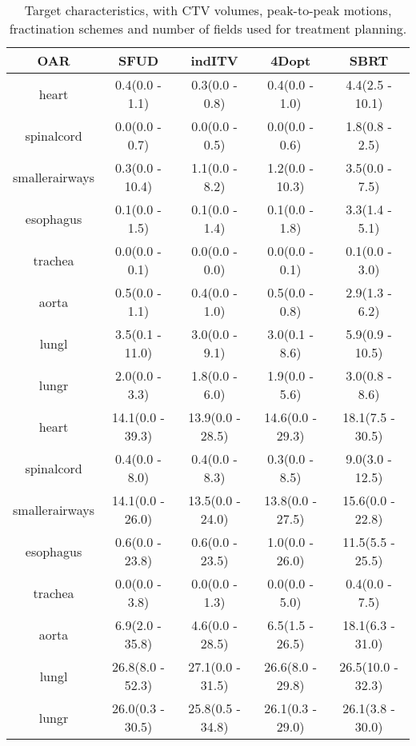 \begin{table}[H]
	\centering
	\caption{Target characteristics, with CTV volumes, peak-to-peak motions, fractination schemes and number of fields used for treatment planning.}
	\begin{tabular}{c|c|c|c|c}
		\hline\hline
		OAR & SFUD & indITV & 4Dopt & SBRT \\
		\hline
heart & 0.4(0.0 - 1.1) & 0.3(0.0 - 0.8) & 0.4(0.0 - 1.0) & 4.4(2.5 - 10.1)  \\ 
spinalcord & 0.0(0.0 - 0.7) & 0.0(0.0 - 0.5) & 0.0(0.0 - 0.6) & 1.8(0.8 - 2.5)  \\ 
smallerairways & 0.3(0.0 - 10.4) & 1.1(0.0 - 8.2) & 1.2(0.0 - 10.3) & 3.5(0.0 - 7.5) \\ 
esophagus & 0.1(0.0 - 1.5) & 0.1(0.0 - 1.4) & 0.1(0.0 - 1.8) & 3.3(1.4 - 5.1)  \\ 
trachea & 0.0(0.0 - 0.1) & 0.0(0.0 - 0.0) & 0.0(0.0 - 0.1) & 0.1(0.0 - 3.0)  \\ 
aorta & 0.5(0.0 - 1.1) & 0.4(0.0 - 1.0) & 0.5(0.0 - 0.8) & 2.9(1.3 - 6.2)  \\ 
lungl & 3.5(0.1 - 11.0) & 3.0(0.0 - 9.1) & 3.0(0.1 - 8.6) & 5.9(0.9 - 10.5)  \\ 
lungr & 2.0(0.0 - 3.3) & 1.8(0.0 - 6.0) & 1.9(0.0 - 5.6) & 3.0(0.8 - 8.6)  \\ 

\hline\hline

heart & 14.1(0.0 - 39.3) & 13.9(0.0 - 28.5) & 14.6(0.0 - 29.3) & 18.1(7.5 - 30.5)\\ 
spinalcord & 0.4(0.0 - 8.0) & 0.4(0.0 - 8.3) & 0.3(0.0 - 8.5) & 9.0(3.0 - 12.5)\\ 
smallerairways & 14.1(0.0 - 26.0) & 13.5(0.0 - 24.0) & 13.8(0.0 - 27.5) & 15.6(0.0 - 22.8)\\ 
esophagus & 0.6(0.0 - 23.8) & 0.6(0.0 - 23.5) & 1.0(0.0 - 26.0) & 11.5(5.5 - 25.5)\\ 
trachea & 0.0(0.0 - 3.8) & 0.0(0.0 - 1.3) & 0.0(0.0 - 5.0) & 0.4(0.0 - 7.5)\\ 
aorta & 6.9(2.0 - 35.8) & 4.6(0.0 - 28.5) & 6.5(1.5 - 26.5) & 18.1(6.3 - 31.0)\\ 
lungl & 26.8(8.0 - 52.3) & 27.1(0.0 - 31.5) & 26.6(8.0 - 29.8) & 26.5(10.0 - 32.3)\\ 
lungr & 26.0(0.3 - 30.5) & 25.8(0.5 - 34.8) & 26.1(0.3 - 29.0) & 26.1(3.8 - 30.0)\\ 
\hline\hline

	\end{tabular}
	\label{tab:resultsComplex}
\end{table}